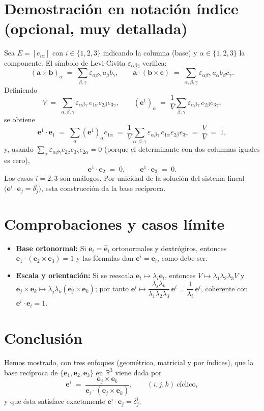 \documentclass[12pt]{article}
\begin{document}
\section*{Demostración en notación índice (opcional, muy detallada)}
Sea $E=[e_{i\alpha}]$ con $i\in\{1,2,3\}$ indicando la columna (base) y $\alpha\in\{1,2,3\}$ la componente. 
El símbolo de Levi-Civita $\varepsilon_{\alpha\beta\gamma}$ verifica:
\[
(\mathbf a\times \mathbf b)_\alpha \;=\; \sum_{\beta,\gamma}\varepsilon_{\alpha\beta\gamma}\,a_\beta b_\gamma,
\qquad
\mathbf a\cdot(\mathbf b\times \mathbf c) \;=\; \sum_{\alpha,\beta,\gamma}\varepsilon_{\alpha\beta\gamma}\,a_\alpha b_\beta c_\gamma.
\]
Definiendo 
\[
V \;=\; \sum_{\alpha,\beta,\gamma}\varepsilon_{\alpha\beta\gamma}\,e_{1\alpha}e_{2\beta}e_{3\gamma},
\qquad
(\mathbf e^1)_\alpha \;=\; \frac{1}{V}\sum_{\beta,\gamma}\varepsilon_{\alpha\beta\gamma}\,e_{2\beta}e_{3\gamma},
\]
se obtiene
\[
\mathbf e^1\cdot \mathbf e_1 
\;=\; \sum_\alpha (\mathbf e^1)_\alpha e_{1\alpha}
\;=\; \frac{1}{V}\sum_{\alpha,\beta,\gamma}\varepsilon_{\alpha\beta\gamma}\,e_{1\alpha}e_{2\beta}e_{3\gamma}
\;=\; \frac{V}{V}\;=\;1,
\]
y, usando $\sum_\alpha \varepsilon_{\alpha\beta\gamma}e_{2\beta}e_{3\gamma}e_{2\alpha}=0$ (porque el determinante con dos columnas iguales es cero),
\[
\mathbf e^1\cdot \mathbf e_2 \;=\; 0,\qquad \mathbf e^1\cdot \mathbf e_3 \;=\; 0.
\]
Los casos $i=2,3$ son análogos. Por unicidad de la solución del sistema lineal $\bigl(\mathbf e^i\cdot \mathbf e_j=\delta^i_j\bigr)$, esta construcción da la base recíproca.

\section*{Comprobaciones y casos límite}
\begin{itemize}
  \item \textbf{Base ortonormal:} Si $\mathbf e_i=\hat{\mathbf e}_i$ ortonormales y dextrógiros, entonces 
  $\mathbf e_1\cdot(\mathbf e_2\times \mathbf e_3)=1$ y las fórmulas dan $\mathbf e^i=\mathbf e_i$, como debe ser.
  \item \textbf{Escala y orientación:} Si se reescala $\mathbf e_i\mapsto \lambda_i\mathbf e_i$, entonces 
  $V\mapsto \lambda_1\lambda_2\lambda_3 V$ y 
  $\mathbf e_j\times \mathbf e_k \mapsto \lambda_j\lambda_k(\mathbf e_j\times \mathbf e_k)$; 
  por tanto $\mathbf e^i \mapsto \dfrac{\lambda_j\lambda_k}{\lambda_1\lambda_2\lambda_3}\,\mathbf e^i=\dfrac{1}{\lambda_i}\,\mathbf e^i$, 
  coherente con $\mathbf e^i\cdot \mathbf e_i=1$.
\end{itemize}

\section*{Conclusión}
Hemos mostrado, con tres enfoques (geométrico, matricial y por índices), que la base recíproca de $\{\mathbf e_1,\mathbf e_2,\mathbf e_3\}$ en $\mathbb R^3$ viene dada por
\[
\mathbf e^i \;=\; \frac{\mathbf e_j \times \mathbf e_k}{\mathbf e_i \cdot (\mathbf e_j \times \mathbf e_k)},
\qquad (i,j,k)\ \text{cíclico},
\]
y que ésta satisface exactamente $\mathbf e^i\cdot \mathbf e_j=\delta^i_j$.
\end{document}
